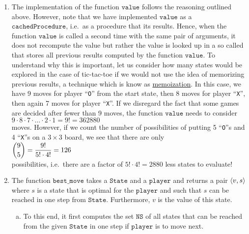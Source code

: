 \begin{enumerate}
\item The implementation of the function $\mathtt{value}$ follows the reasoning outlined above.
      However, note that we have implemented $\mathtt{value}$ as a $\mathtt{cachedProcedure}$, i.e.~as a
      procedure that  its results.  Hence, when the function $\mathtt{value}$ is called a
      second time with the same pair of arguments, it does not recompute the value but rather the value is
      looked up in a so called  that stores all previous results computed by the function $\mathtt{value}$.  To
      understand why this is important, 
      let us consider how many states would be explored in the case of tic-tac-toe if we would not use the idea
      of memorizing previous results, a technique which is know as 
      \href{https://en.wikipedia.org/wiki/Memoization}{memoization}.  In this case, we have 9 moves for player
      ``\texttt{O}'' from the start state, then 8 moves for player ``\texttt{X}'', then again 7 moves for
      player ``\texttt{X}''.  If we disregard the fact that some games are decided after fewer than 9 moves,
      the function $\mathtt{value}$ needs to consider 
      \\[0.2cm]
      \hspace*{1.3cm}
      $9 \cdot 8 \cdot 7 \cdot {\dots} \cdot 2 \cdot 1 = 9! = 362880$
      \\[0.2cm]
      moves.  However, if we count the number of possibilities of putting 5 ``\texttt{O}''s and 4
      ``\texttt{X}''s on a $3 \times 3$ board, we see that there are only
      \\[0.2cm]
      \hspace*{1.3cm}
      $\displaystyle {9 \choose 5} = \frac{9!}{5! \cdot 4!} = 126$
      \\[0.2cm]
      possibilities, i.e.~there are a factor of $5! \cdot 4! = 2880$ less states to evaluate!
\item The function $\mathtt{best\_move}$ takes a $\mathtt{State}$ and a $\mathtt{player}$ and returns a pair $\pair(v,s)$
      where $s$ is a state that is optimal for the $\mathtt{player}$ and such that $s$ can be reached in one step from
      $\mathtt{State}$.  Furthermore, $v$ is the value of this state.
      \begin{enumerate}[(a)]
      \item To this end, it first computes the set $\mathtt{NS}$ of all states that can be reached 
            from the given $\mathtt{State}$ in one step if $\mathtt{player}$ is to move next.

\end{enumerate}
\end{enumerate}
